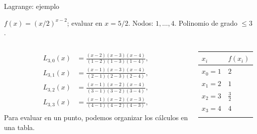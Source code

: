 \documentclass[original_version/main.tex]{subfiles}
\begin{document}
\begin{frame}[t]{Lagrange: ejemplo}
\par\noindent\begin{minipage}[t][7.5mm][t]{\textwidth}\small\strut $f(x)=(x/2)^{x-2}$; evaluar en $x=5/2$. Nodos: $1,\ldots,4$. Polinomio de grado $\le 3$.\end{minipage}\par\nointerlineskip
\begin{columns}[T]\small\setlength{\abovedisplayskip}{4pt}\setlength{\belowdisplayskip}{4pt}\scriptsize\begin{align*}L_{3,0}(x)&=\frac{(x-2)(x-3)(x-4)}{(1-2)(1-3)(1-4)},\\L_{3,1}(x)&=\frac{(x-1)(x-3)(x-4)}{(2-1)(2-3)(2-4)},\\L_{3,2}(x)&=\frac{(x-1)(x-2)(x-4)}{(3-1)(3-2)(3-4)},\\L_{3,3}(x)&=\frac{(x-1)(x-2)(x-3)}{(4-1)(4-2)(4-3)},\\\end{align*}\small Para evaluar en un punto, podemos organizar los cálculos en una tabla.\begingroup\small\setlength{\tabcolsep}{3pt}\begin{center}\begin{tabular}{|C{.42\textwidth}|C{.42\textwidth}|}\hline
\rule[-2mm]{0pt}{6mm}$x_i$&$f(x_i)$\\\hline
\rule[-2.5mm]{0pt}{6mm}$x_0=1$&$2$\\\hline
\rule[-2.5mm]{0pt}{6mm}$x_1=2$&$1$\\\hline
\rule[-2.5mm]{0pt}{6mm}$x_2=3$&$\frac{3}{2}$\\\hline
\rule[-2.5mm]{0pt}{6mm}$x_3=4$&$4$\\\hline
\rule[-2.5mm]{0pt}{6mm}&\\\hline
\end{tabular}\end{center}\endgroup\par
\end{columns}
\end{frame}
\end{document}
